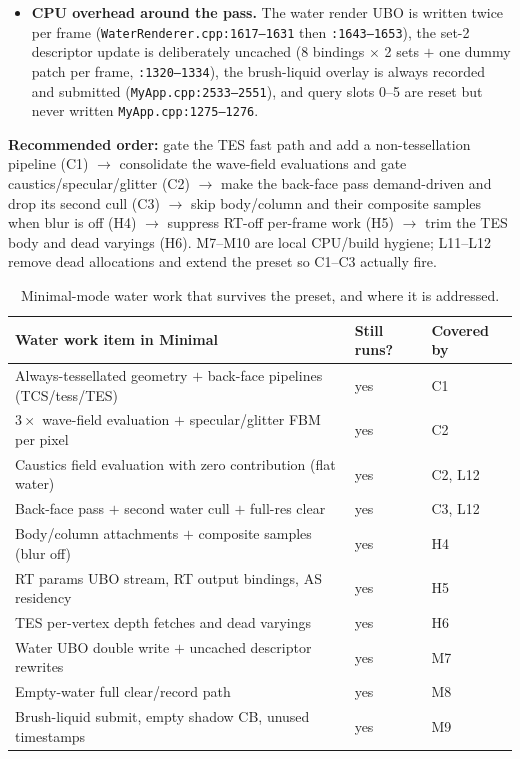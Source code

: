 \documentclass[11pt,a4paper]{article}
\begin{document}
\begin{itemize}
    \texttt{RayTracingResources.cpp:1241--1246}), the water set-2 bindings still point at RT output images because the gate is \texttt{isSupported()} rather than
    \texttt{runtimeEnabled()} (\texttt{MyApp.cpp:2294--2297, 2372--2374}), and the AS/proxy allocations stay resident (\texttt{RayTracingResources.cpp:59--86}).
    \item \textbf{CPU overhead around the pass.} The water render UBO is written twice per frame (\texttt{WaterRenderer.cpp:1617--1631} then \texttt{:1643--1653}), the set-2 descriptor
    update is deliberately uncached (8 bindings $\times$ 2 sets $+$ one dummy patch per frame, \texttt{:1320--1334}), the brush-liquid overlay is always recorded and submitted
    (\texttt{MyApp.cpp:2533--2551}), and query slots 0--5 are reset but never written \texttt{MyApp.cpp:1275--1276}.
\end{itemize}

\textbf{Recommended order:} gate the TES fast path and add a non-tessellation pipeline (C1) $\rightarrow$ consolidate the wave-field evaluations and gate caustics/specular/glitter
(C2) $\rightarrow$ make the back-face pass demand-driven and drop its second cull (C3) $\rightarrow$ skip body/column and their composite samples when blur is off (H4) $\rightarrow$
suppress RT-off per-frame work (H5) $\rightarrow$ trim the TES body and dead varyings (H6). M7--M10 are local CPU/build hygiene; L11--L12 remove dead allocations and extend the
preset so C1--C3 actually fire.

\begin{table}[h]
\centering
\small
\begin{tabular}{@{}lll@{}}
\toprule
\textbf{Water work item in Minimal} & \textbf{Still runs?} & \textbf{Covered by} \\
\midrule
Always-tessellated geometry $+$ back-face pipelines (TCS/tess/TES) & yes & C1 \\
$3\times$ wave-field evaluation $+$ specular/glitter FBM per pixel & yes & C2 \\
Caustics field evaluation with zero contribution (flat water) & yes & C2, L12 \\
Back-face pass $+$ second water cull $+$ full-res clear & yes & C3, L12 \\
Body/column attachments $+$ composite samples (blur off) & yes & H4 \\
RT params UBO stream, RT output bindings, AS residency & yes & H5 \\
TES per-vertex depth fetches and dead varyings & yes & H6 \\
Water UBO double write $+$ uncached descriptor rewrites & yes & M7 \\
Empty-water full clear/record path & yes & M8 \\
Brush-liquid submit, empty shadow CB, unused timestamps & yes & M9 \\
\bottomrule
\end{tabular}
\caption{Minimal-mode water work that survives the preset, and where it is addressed.}
\end{table}
\end{document}
